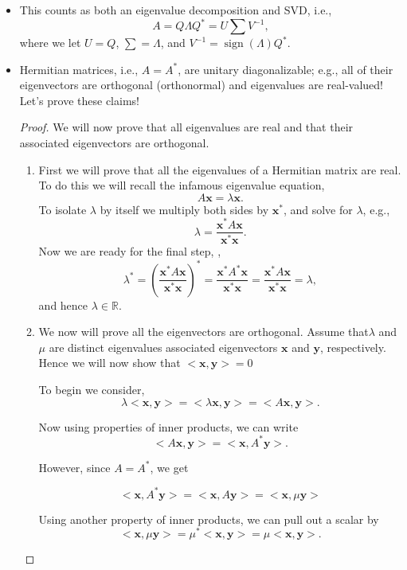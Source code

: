 \documentclass[paper=a4, fontsize=11pt]{scrartcl} %
\DeclareMathOperator{\sign}{sign}
\numberwithin{equation}{section} %
\numberwithin{figure}{section} %
\numberwithin{table}{section} %
\begin{document}
\begin{enumerate}
\begin{itemize}
\item This counts as both an eigenvalue decomposition and SVD, i.e., $$A=Q\Lambda Q^{*}=U\sum V^{-1},$$
where we let $U=Q$, $\sum = \Lambda$, and $V^{-1} = \sign(\Lambda)Q^{*}.$
%
\item Hermitian matrices, i.e., $A=A^{*}$, are unitary diagonalizable; e.g., all of their eigenvectors are orthogonal (orthonormal) and eigenvalues are real-valued!  Let's prove these claims!
%
\begin{proof} We will now prove that all eigenvalues are real and that their associated eigenvectors are orthogonal. 
\begin{enumerate}
\item First we will prove that all the eigenvalues of a Hermitian matrix are real. To do this we will recall the infamous eigenvalue equation, $$A\textbf{x}=\lambda\textbf{x}.$$ To isolate $\lambda$ by itself we multiply both sides by $\textbf{x}^{*}$, and solve for $\lambda$, e.g., $$\lambda = \frac{ \textbf{x}^{*} A \textbf{x}    }{  \textbf{x}^{*} \textbf{x}   }.$$
Now we are ready for the final step, ,
$$\lambda^{*} = \left( \frac{ \textbf{x}^{*} A \textbf{x}    }{  \textbf{x}^{*} \textbf{x}   } \right)^{*}  = \frac{ \textbf{x}^{*} A^{*} \textbf{x}    }{  \textbf{x}^{*} \textbf{x}   } =  \frac{ \textbf{x}^{*} A \textbf{x}    }{  \textbf{x}^{*} \textbf{x}   } = \lambda,$$ and hence $\lambda\in\mathbb{R}.$

\item We now will prove all the eigenvectors are orthogonal. Assume that$\lambda$ and $\mu$ are distinct eigenvalues associated eigenvectors $\textbf{x}$ and $\textbf{y}$, respectively. Hence we will now show that $<\textbf{x},\textbf{y}>=0$

To begin we consider, $$\lambda<\textbf{x},\textbf{y}> = <\lambda\textbf{x},\textbf{y}> = <A\textbf{x},\textbf{y}>.$$

Now using properties of inner products, we can write $$<A\textbf{x},\textbf{y}> = <\textbf{x},A^{*}\textbf{y}>.$$

However, since $A=A^{*}$, we get

$$<\textbf{x},A^{*}\textbf{y}> = <\textbf{x},A\textbf{y} > = <\textbf{x},\mu\textbf{y}>$$

Using another property of inner products, we can pull out a scalar by 
$$<\textbf{x},\mu\textbf{y}> = \mu^{*}<\textbf{x},\textbf{y}> = \mu <\textbf{x},\textbf{y}>.$$


\end{enumerate}
\end{proof}
\end{itemize}
\end{enumerate}
\end{document}

